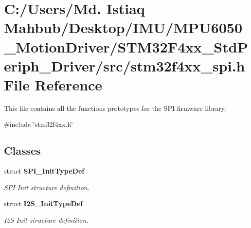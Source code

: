 \section{C\+:/\+Users/\+Md. Istiaq Mahbub/\+Desktop/\+I\+M\+U/\+M\+P\+U6050\+\_\+\+Motion\+Driver/\+S\+T\+M32\+F4xx\+\_\+\+Std\+Periph\+\_\+\+Driver/src/stm32f4xx\+\_\+spi.h File Reference}
\label{stm32f4xx__spi_8h}


This file contains all the functions prototypes for the S\+PI firmware library.  


{\ttfamily \#include \char`\"{}stm32f4xx.\+h\char`\"{}}\newline
\subsection*{Classes}
\begin{DoxyCompactItemize}
\item 
struct \textbf{ S\+P\+I\+\_\+\+Init\+Type\+Def}
\begin{DoxyCompactList}\small\item\em S\+PI Init structure definition. \end{DoxyCompactList}\item 
struct \textbf{ I2\+S\+\_\+\+Init\+Type\+Def}
\begin{DoxyCompactList}\small\item\em I2S Init structure definition. \end{DoxyCompactList}\end{DoxyCompactItemize}
